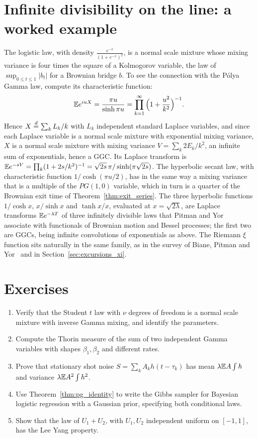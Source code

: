 \section{Infinite divisibility on the line: a worked example}

The logistic law, with density $\frac{e^{-x}}{(1+e^{-x})^2}$, is a normal scale mixture whose mixing variance is four times the square of a Kolmogorov variable, the law of $\sup_{0\leq t\leq1}|b_t|$ for a Brownian bridge $b$. To see the connection with the P\'olya Gamma law, compute its characteristic function:
\[
\mathbb{E} e^{iuX} = \frac{\pi u}{\sinh\pi u} = \prod_{k=1}^\infty\Big(1+\frac{u^2}{k^2}\Big)^{-1}.
\]
Hence $X\stackrel{d}{=}\sum_kL_k/k$ with $L_k$ independent standard Laplace variables, and since each Laplace variable is a normal scale mixture with exponential mixing variance, $X$ is a normal scale mixture with mixing variance $V = \sum_k2E_k/k^2$, an infinite sum of exponentials, hence a GGC. Its Laplace transform is $\mathbb{E} e^{-sV} = \prod_k(1+2s/k^2)^{-1} = \sqrt{2s}\,\pi/\sinh(\pi\sqrt{2s})$. The hyperbolic secant law, with characteristic function $1/\cosh(\pi u/2)$, has in the same way a mixing variance that is a multiple of the $PG(1,0)$ variable, which in turn is a quarter of the Brownian exit time of Theorem~\ref{thm:exit_series}. The three hyperbolic functions $1/\cosh x$, $x/\sinh x$ and $\tanh x/x$, evaluated at $x = \sqrt{2\lambda}$, are Laplace transforms $\mathbb{E} e^{-\lambda T}$ of three infinitely divisible laws that Pitman and Yor~\cite{pitman2003} associate with functionals of Brownian motion and Bessel processes; the first two are GGCs, being infinite convolutions of exponentials as above. The Riemann $\xi$ function sits naturally in the same family, as in the survey of Biane, Pitman and Yor~\cite{bpy2001} and in Section~\ref{sec:excursions_xi}.

\section*{Exercises}
\begin{enumerate}
\item Verify that the Student $t$ law with $\nu$ degrees of freedom is a normal scale mixture with inverse Gamma mixing, and identify the parameters.
\item Compute the Thorin measure of the sum of two independent Gamma variables with shapes $\beta_1,\beta_2$ and different rates.
\item Prove that stationary shot noise $S = \sum_kA_kh(t-\tau_k)$ has mean $\lambda\mathbb{E} A\int h$ and variance $\lambda\mathbb{E} A^2\int h^2$.
\item Use Theorem~\ref{thm:pg_identity} to write the Gibbs sampler for Bayesian logistic regression with a Gaussian prior, specifying both conditional laws.
\item Show that the law of $U_1+U_2$, with $U_1,U_2$ independent uniform on $[-1,1]$, has the Lee Yang property.
\end{enumerate}

